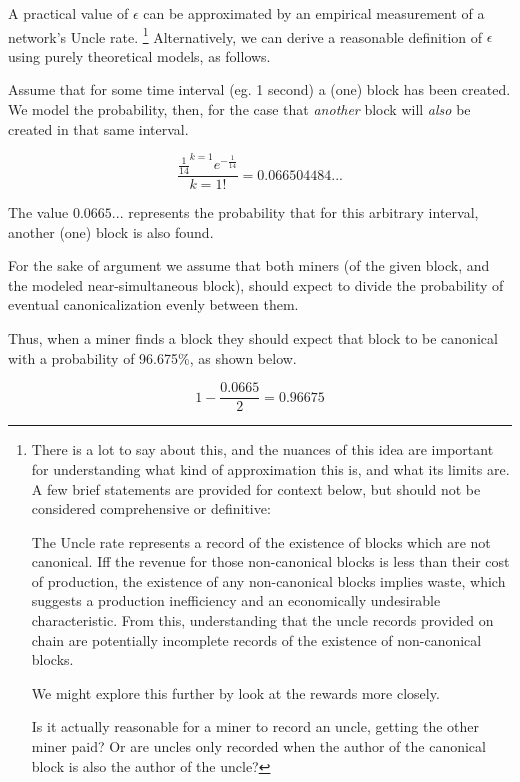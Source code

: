 \documentclass[11pt]{article}
\theoremstyle{plain}
\begin{document}
A practical value of $\epsilon$ can be approximated by an empirical measurement
of a network's Uncle rate.\nolinebreak
\footnote{
  There is a lot to say about this, and the nuances of this idea are important
for understanding what kind of approximation this is, and what its limits are.
  A few brief statements are provided for context below, but should not be
considered comprehensive or definitive:

  The Uncle rate represents a record of the existence of blocks which are not
canonical.
  Iff the revenue for those non-canonical blocks is less than their cost of
production, the existence of any non-canonical blocks implies waste, which
suggests a production inefficiency and an economically undesirable
characteristic.
  From this, understanding that the uncle records provided on chain are
potentially incomplete records of the existence of non-canonical blocks.

  We might explore this further by look at the rewards more closely.

  Is it actually reasonable for a miner to record an uncle, getting the
  other miner paid? Or are uncles only recorded when the author of the
  canonical block is also the author of the uncle?
}
Alternatively, we can derive a reasonable definition of $\epsilon$ using purely
theoretical models, as follows.

Assume that for some time interval (eg. 1 second) a (one) block has been created.
We model the probability, then, for the case that \emph{another} block
will \emph{also} be created in that same interval.

\begin{equation}
    \frac{\frac{1}{14}^{k=1}e^{-\frac{1}{14}}}{k=1!} = 0.066504484...
\end{equation}

The value $0.0665...$ represents the probability that for this arbitrary interval,
another (one) block is also found.

For the sake of argument we assume that both miners
(of the given block, and the modeled near-simultaneous block),
should expect to divide the probability of eventual canonicalization evenly between them.

Thus, when a miner finds a block they should expect that block to be canonical
with a probability of 96.675\%, as shown below.

\begin{equation}
    1 - \frac{0.0665}{2} = 0.96675
\end{equation}
\end{document}
